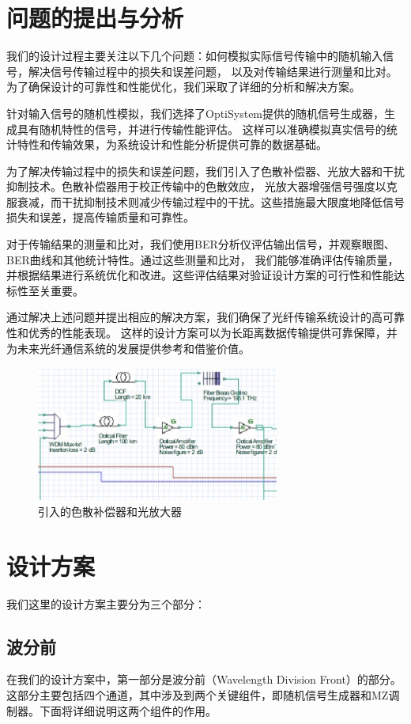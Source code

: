 \documentclass[12pt, a4paper, oneside]{article}
\begin{document}
\begin{spacing}{2.0}
\section{问题的提出与分析}
我们的设计过程主要关注以下几个问题：如何模拟实际信号传输中的随机输入信号，解决信号传输过程中的损失和误差问题，
以及对传输结果进行测量和比对。为了确保设计的可靠性和性能优化，我们采取了详细的分析和解决方案。

针对输入信号的随机性模拟，我们选择了OptiSystem提供的随机信号生成器，生成具有随机特性的信号，并进行传输性能评估。
这样可以准确模拟真实信号的统计特性和传输效果，为系统设计和性能分析提供可靠的数据基础。

为了解决传输过程中的损失和误差问题，我们引入了色散补偿器、光放大器和干扰抑制技术。色散补偿器用于校正传输中的色散效应，
光放大器增强信号强度以克服衰减，而干扰抑制技术则减少传输过程中的干扰。这些措施最大限度地降低信号损失和误差，提高传输质量和可靠性。

对于传输结果的测量和比对，我们使用BER分析仪评估输出信号，并观察眼图、BER曲线和其他统计特性。通过这些测量和比对，
我们能够准确评估传输质量，并根据结果进行系统优化和改进。这些评估结果对验证设计方案的可行性和性能达标性至关重要。

通过解决上述问题并提出相应的解决方案，我们确保了光纤传输系统设计的高可靠性和优秀的性能表现。
这样的设计方案可以为长距离数据传输提供可靠保障，并为未来光纤通信系统的发展提供参考和借鉴价值。




\begin{figure}[htbp]
	\centering
	\includegraphics[width=8cm]{figure2.png}
	\caption{引入的色散补偿器和光放大器}
\end{figure}
\clearpage
\section{设计方案}
我们这里的设计方案主要分为三个部分：
\subsection{波分前}
在我们的设计方案中，第一部分是波分前（Wavelength Division Front）的部分。
这部分主要包括四个通道，其中涉及到两个关键组件，即随机信号生成器和MZ调制器。下面将详细说明这两个组件的作用。

\end{spacing}
\end{document}

